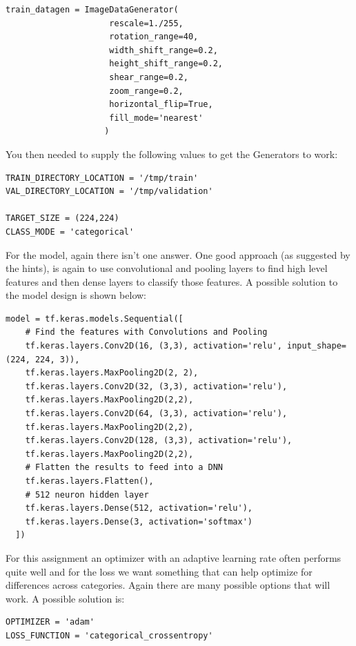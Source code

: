 \begin{lstlisting}
train_datagen = ImageDataGenerator(
                     rescale=1./255,
                     rotation_range=40,
                     width_shift_range=0.2,
                     height_shift_range=0.2,
                     shear_range=0.2,
                     zoom_range=0.2,
                     horizontal_flip=True,
                     fill_mode='nearest'
                    )
\end{lstlisting}

You then needed to supply the following values to get the Generators to work:

\begin{lstlisting}
TRAIN_DIRECTORY_LOCATION = '/tmp/train'
VAL_DIRECTORY_LOCATION = '/tmp/validation'

TARGET_SIZE = (224,224)
CLASS_MODE = 'categorical'
\end{lstlisting}

For the model, again there isn’t one answer. One good approach (as suggested by the hints), is again to use convolutional and pooling layers to find high level features and then dense layers to classify those features. A possible solution to the model design is shown below:

\begin{lstlisting}
model = tf.keras.models.Sequential([
    # Find the features with Convolutions and Pooling
    tf.keras.layers.Conv2D(16, (3,3), activation='relu', input_shape=(224, 224, 3)),
    tf.keras.layers.MaxPooling2D(2, 2),
    tf.keras.layers.Conv2D(32, (3,3), activation='relu'),
    tf.keras.layers.MaxPooling2D(2,2),
    tf.keras.layers.Conv2D(64, (3,3), activation='relu'),
    tf.keras.layers.MaxPooling2D(2,2),
    tf.keras.layers.Conv2D(128, (3,3), activation='relu'),
    tf.keras.layers.MaxPooling2D(2,2),
    # Flatten the results to feed into a DNN
    tf.keras.layers.Flatten(),
    # 512 neuron hidden layer
    tf.keras.layers.Dense(512, activation='relu'),
    tf.keras.layers.Dense(3, activation='softmax')
  ])
\end{lstlisting}

For this assignment an optimizer with an adaptive learning rate often performs quite well and for the loss we want something that can help optimize for differences across categories. Again there are many possible options that will work. A possible solution is:

\begin{lstlisting}
OPTIMIZER = 'adam'
LOSS_FUNCTION = 'categorical_crossentropy'
\end{lstlisting}

